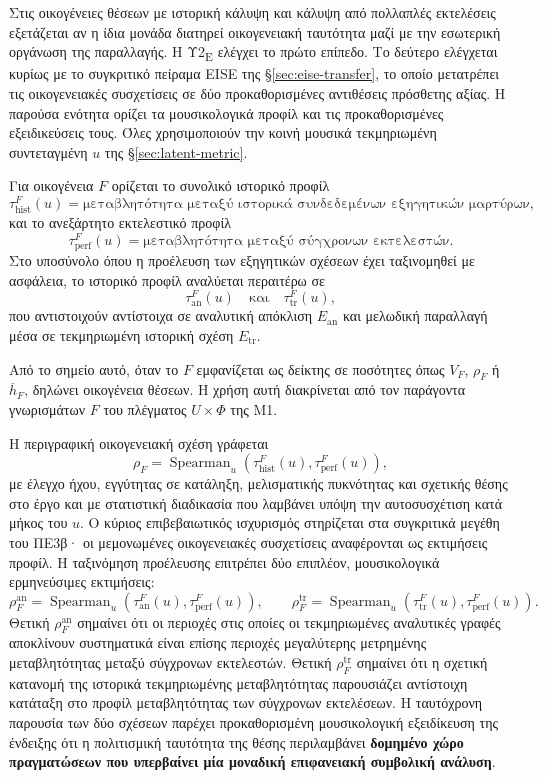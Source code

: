\documentclass[11pt,a4paper]{article}
\begin{document}
Στις οικογένειες θέσεων με ιστορική κάλυψη και κάλυψη από πολλαπλές εκτελέσεις εξετάζεται αν η ίδια μονάδα διατηρεί οικογενειακή ταυτότητα μαζί με την εσωτερική οργάνωση της παραλλαγής. Η Υ2\textsubscript{E} ελέγχει το πρώτο επίπεδο. Το δεύτερο ελέγχεται κυρίως με το συγκριτικό πείραμα EISE της \S\ref{sec:eise-transfer}, το οποίο μετατρέπει τις οικογενειακές συσχετίσεις σε δύο προκαθορισμένες αντιθέσεις πρόσθετης αξίας. Η παρούσα ενότητα ορίζει τα μουσικολογικά προφίλ και τις προκαθορισμένες εξειδικεύσεις τους. Όλες χρησιμοποιούν την κοινή μουσικά τεκμηριωμένη συντεταγμένη $u$ της \S\ref{sec:latent-metric}.

Για οικογένεια $F$ ορίζεται το συνολικό ιστορικό προφίλ
\[
\tau_{\mathrm{hist}}^{F}(u)=\text{μεταβλητότητα μεταξύ ιστορικά συνδεδεμένων εξηγητικών μαρτύρων},
\]
και το ανεξάρτητο εκτελεστικό προφίλ
\[
\tau_{\mathrm{perf}}^{F}(u)=\text{μεταβλητότητα μεταξύ σύγχρονων εκτελεστών}.
\]
Στο υποσύνολο όπου η προέλευση των εξηγητικών σχέσεων έχει ταξινομηθεί με ασφάλεια, το ιστορικό προφίλ αναλύεται περαιτέρω σε
\[
\tau_{\mathrm{an}}^{F}(u)\quad\text{και}\quad\tau_{\mathrm{tr}}^{F}(u),
\]
που αντιστοιχούν αντίστοιχα σε αναλυτική απόκλιση $E_{\mathrm{an}}$ και μελωδική παραλλαγή μέσα σε τεκμηριωμένη ιστορική σχέση $E_{\mathrm{tr}}$.

Από το σημείο αυτό, όταν το $F$ εμφανίζεται ως δείκτης σε ποσότητες όπως $V_F$, $\rho_F$ ή $\overline h_F$, δηλώνει οικογένεια θέσεων. Η χρήση αυτή διακρίνεται από τον παράγοντα γνωρισμάτων $F$ του πλέγματος $U\times\Phi$ της M1.

Η περιγραφική οικογενειακή σχέση γράφεται
\[
\rho_F=\operatorname{Spearman}_{u}\!\left(\tau_{\mathrm{hist}}^{F}(u),\tau_{\mathrm{perf}}^{F}(u)\right),
\]
με έλεγχο ήχου, εγγύτητας σε κατάληξη, μελισματικής πυκνότητας και σχετικής θέσης στο έργο και με στατιστική διαδικασία που λαμβάνει υπόψη την αυτοσυσχέτιση κατά μήκος του $u$. Ο κύριος επιβεβαιωτικός ισχυρισμός στηρίζεται στα συγκριτικά μεγέθη του ΠΕ3β· οι μεμονωμένες οικογενειακές συσχετίσεις αναφέρονται ως εκτιμήσεις προφίλ. Η ταξινόμηση προέλευσης επιτρέπει δύο επιπλέον, μουσικολογικά ερμηνεύσιμες εκτιμήσεις:
\[
\rho_F^{\mathrm{an}}=\operatorname{Spearman}_{u}\!\left(\tau_{\mathrm{an}}^{F}(u),\tau_{\mathrm{perf}}^{F}(u)\right),
\qquad
\rho_F^{\mathrm{tr}}=\operatorname{Spearman}_{u}\!\left(\tau_{\mathrm{tr}}^{F}(u),\tau_{\mathrm{perf}}^{F}(u)\right).
\]
Θετική $\rho_F^{\mathrm{an}}$ σημαίνει ότι οι περιοχές στις οποίες οι τεκμηριωμένες αναλυτικές γραφές αποκλίνουν συστηματικά είναι επίσης περιοχές μεγαλύτερης μετρημένης μεταβλητότητας μεταξύ σύγχρονων εκτελεστών. Θετική $\rho_F^{\mathrm{tr}}$ σημαίνει ότι η σχετική κατανομή της ιστορικά τεκμηριωμένης μεταβλητότητας παρουσιάζει αντίστοιχη κατάταξη στο προφίλ μεταβλητότητας των σύγχρονων εκτελέσεων. Η ταυτόχρονη παρουσία των δύο σχέσεων παρέχει προκαθορισμένη μουσικολογική εξειδίκευση της ένδειξης ότι η πολιτισμική ταυτότητα της θέσης περιλαμβάνει \textbf{δομημένο χώρο πραγματώσεων που υπερβαίνει μία μοναδική επιφανειακή συμβολική ανάλυση}.
\end{document}
